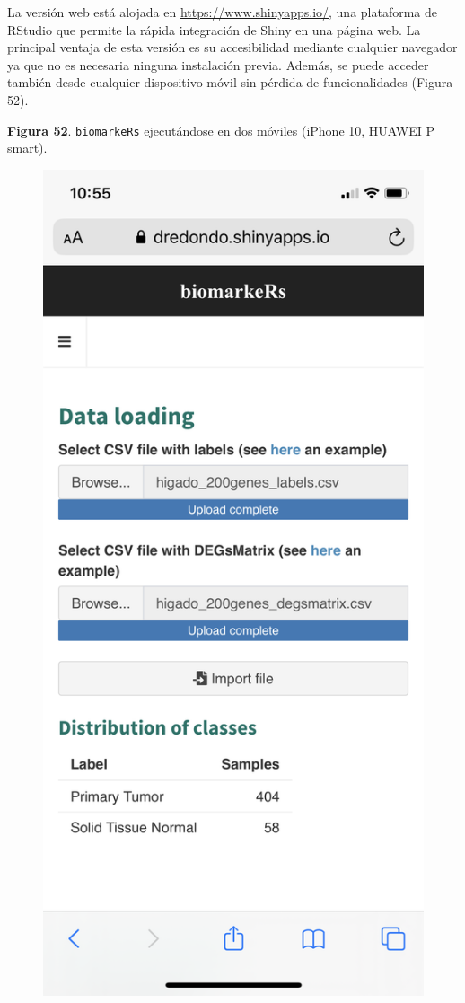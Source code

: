 La versión web está alojada en \url{https://www.shinyapps.io/}, una plataforma de RStudio que permite la rápida integración de Shiny en una página web. La principal ventaja de esta versión es su accesibilidad mediante cualquier navegador ya que no es necesaria ninguna instalación previa. Además, se puede acceder también desde cualquier dispositivo móvil sin pérdida de funcionalidades (Figura 52).\\

\newpage
\begin{center}
	\textbf{Figura 52}.  \texttt{biomarkeRs} ejecutándose en dos móviles (iPhone 10, HUAWEI P smart).
	
	\begin{figure}[H]
		\centering
		\begin{minipage}{.5\textwidth}
			\centering
			\includegraphics[width=.75\textwidth]{figuras/52_app_iphone.png}

\end{minipage}
\end{figure}
\end{center}
